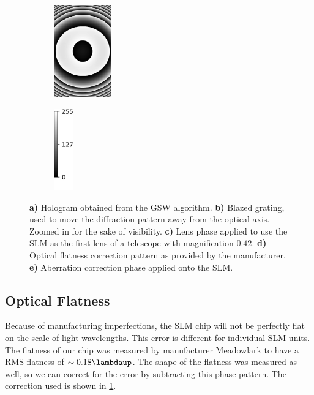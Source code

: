 \begin{figure}
\begin{subfigure}{.18\linewidth}
		\caption{}
		\label{fig:Flatness}
	\end{subfigure}
	\begin{subfigure}{.18\linewidth}
		\centering
		\includegraphics[height=4cm]{figures/SLMphase/zernike.jpg}
		\caption{}
		\label{fig:Zernike}
	\end{subfigure}
	\begin{subfigure}{0.055\linewidth}
		\centering
		\includegraphics[height = 3.5cm]{figures/SLMphase/colorbar.jpg}
	\end{subfigure}
	\caption{
		\textbf{a)} Hologram obtained from the \ac{GSW} algorithm.
		\textbf{b)} Blazed grating, used to move the diffraction pattern away from the optical axis. Zoomed in for the sake of visibility.
		\textbf{c)} Lens phase applied to use the SLM as the first lens of a telescope with magnification $0.42$.
		\textbf{d)} Optical flatness correction pattern as provided by the manufacturer.
		\textbf{e)} Aberration correction phase applied onto the SLM.
	}
	\label{fig:SLMphase}
\end{figure}

\subsection{Optical Flatness}\label{subsec:Flatness}

Because of manufacturing imperfections, the SLM chip will not be perfectly flat on the scale of light wavelengths. 
This error is different for individual SLM units.
The flatness of our chip was measured by manufacturer Meadowlark to have a RMS flatness of $\sim 0.18\lambdaup$.
The shape of the flatness was measured as well, so we can correct for the error by subtracting this phase pattern. 
The correction used is shown in \cref{fig:Flatness}.


